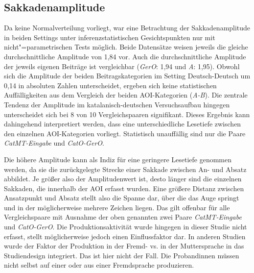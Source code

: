 \begin{sloppypar}
\subsection{Sakkadenamplitude}\label{K7:para:sacamp}
Da keine Normalverteilung vorliegt, war eine Betrachtung der Sakkadenamplitude in beiden Settings unter inferenzstatistischen Gesichtspunkten nur mit nicht"=parametrischen Tests möglich. Beide Datensätze weisen jeweils die gleiche durchschnittliche Amplitude von 1,84 vor. Auch die durchschnittliche Amplitude der jeweils eigenen Beiträge ist vergleichbar (\emph{GerO}: 1,94 und \emph{A}: 1,95). Obwohl sich die Amplitude der beiden Beitragskategorien im Setting Deutsch-Deutsch um 0,14 in absoluten Zahlen unterscheidet, ergeben sich keine statistischen Auffälligkeiten aus dem Vergleich der beiden AOI-Kategorien (\emph{A-B}). Die zentrale Tendenz der Amplitude im katalanisch-deutschen Versuchsaufbau hingegen unterscheidet sich bei 8 von 10 Vergleichspaaren signifikant. Dieses Ergebnis kann dahingehend interpretiert werden, dass eine unterschiedliche Lesetiefe zwischen den einzelnen AOI-Kategorien vorliegt. Statistisch unauffällig sind nur die Paare \emph{CatMT-Eingabe} und \emph{CatO-GerO}. 
\end{sloppypar}

Die höhere Amplitude kann als Indiz für eine geringere Lesetiefe genommen werden, da sie die zurückgelegte Strecke einer Sakkade zwischen An- und Absatz abbildet. Je größer also der Amplitudenwert ist, desto länger sind die einzelnen Sakkaden, die innerhalb der AOI erfasst wurden. Eine größere Distanz zwischen Ansatzpunkt und Absatz stellt also die Spanne dar, über die das Auge springt und in der möglicherweise mehrere Zeichen liegen. Das gilt offenbar für alle Vergleichspaare mit Ausnahme der oben genannten zwei Paare \emph{CatMT-Eingabe} und \emph{CatO-GerO}. Die Produktionsaktivität wurde hingegen in dieser Studie nicht erfasst, stellt möglicherweise jedoch einen Einflussfaktor dar. In anderen Studien wurde der Faktor der Produktion in der Fremd- vs. in der Muttersprache in das Studiendesign integriert. Das ist hier nicht der Fall. Die Proband{\textperiodcentered}innen müssen nicht selbst auf einer oder aus einer Fremdsprache produzieren.


